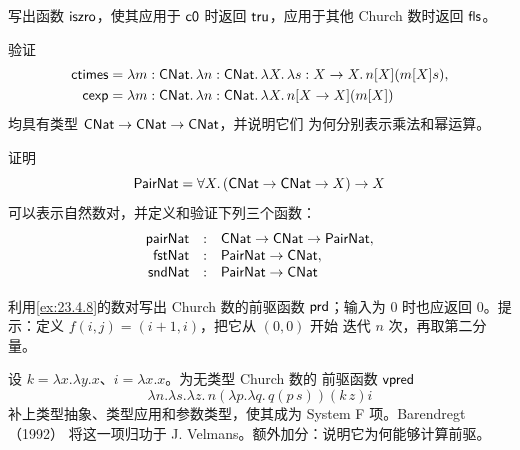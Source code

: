 \begin{exercise}
\label{ex:23.4.6}
写出函数 \(\mathsf{iszro}\)，使其应用于 \(\mathsf{c0}\) 时返回
\(\mathsf{tru}\)，应用于其他 Church 数时返回 \(\mathsf{fls}\)。
\end{exercise}

\begin{exercise}[\(\star\star\)]
\label{ex:23.4.7}
验证
\[
\begin{aligned}
\mathsf{ctimes}
 &=\lambda m:\mathsf{CNat}.\,\lambda n:\mathsf{CNat}.\,
   \lambda X.\,\lambda s:X\to X.\,n[X](m[X]s),\\
\mathsf{cexp}
 &=\lambda m:\mathsf{CNat}.\,\lambda n:\mathsf{CNat}.\,
   \lambda X.\,n[X\to X](m[X])
\end{aligned}
\]
均具有类型
\(\mathsf{CNat}\to\mathsf{CNat}\to\mathsf{CNat}\)，并说明它们
为何分别表示乘法和幂运算。
\end{exercise}

\begin{exercise}
\label{ex:23.4.8}
证明
\[
\mathsf{PairNat}
=\forall X.\,(\mathsf{CNat}\to\mathsf{CNat}\to X)\to X
\]
可以表示自然数对，并定义和验证下列三个函数：
\[
\begin{array}{rcl}
\mathsf{pairNat}&:&\mathsf{CNat}\to\mathsf{CNat}\to\mathsf{PairNat},\\
\mathsf{fstNat}&:&\mathsf{PairNat}\to\mathsf{CNat},\\
\mathsf{sndNat}&:&\mathsf{PairNat}\to\mathsf{CNat}
\end{array}
\]
\end{exercise}

\begin{exercise}
\label{ex:23.4.9}
利用\cref{ex:23.4.8}的数对写出 Church 数的前驱函数 \(\mathsf{prd}\)；输入为
\(0\) 时也应返回 \(0\)。提示：定义 \(f(i,j)=(i+1,i)\)，把它从 \((0,0)\) 开始
迭代 \(n\) 次，再取第二分量。
\end{exercise}

\begin{exercise}[\(\star\star\star\)]
\label{ex:23.4.10}
设 \(k=\lambda x.\lambda y.x\)、\(i=\lambda x.x\)。为无类型 Church 数的
前驱函数 \(\mathsf{vpred}\)
\[
\lambda n.\lambda s.\lambda z.\,
n(\lambda p.\lambda q.\,q(p\,s))(k\,z)i
\]
补上类型抽象、类型应用和参数类型，使其成为 System F 项。Barendregt（1992）
将这一项归功于 J. Velmans。额外加分：说明它为何能够计算前驱。
\end{exercise}


